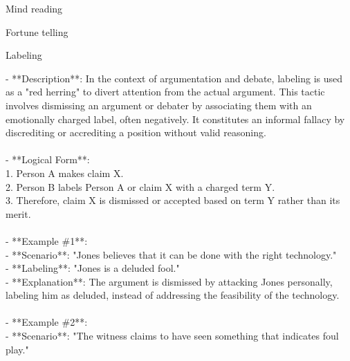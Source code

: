 \documentclass[a4paper,12pt,single,pdftex]{scrartcl}
\begin{document}
Mind reading

Fortune telling

Labeling
    
      - **Description**: In the context of argumentation and debate, labeling is used as a "red herring" to divert attention from the actual argument. This tactic involves dismissing an argument or debater by associating them with an emotionally charged label, often negatively. It constitutes an informal fallacy by discrediting or accrediting a position without valid reasoning.
    \\

    
      
    \\

    
      - **Logical Form**:
    \\

    
        1. Person A makes claim X.
    \\

    
        2. Person B labels Person A or claim X with a charged term Y.
    \\

    
        3. Therefore, claim X is dismissed or accepted based on term Y rather than its merit.
    \\

    
      
    \\

    
      - **Example \#1**:
    \\

    
        - **Scenario**: "Jones believes that it can be done with the right technology."
    \\

    
        - **Labeling**: "Jones is a deluded fool."
    \\

    
        - **Explanation**: The argument is dismissed by attacking Jones personally, labeling him as deluded, instead of addressing the feasibility of the technology.
    \\

    
      
    \\

    
      - **Example \#2**:
    \\

    
        - **Scenario**: "The witness claims to have seen something that indicates foul play."
    \\
\end{document}
